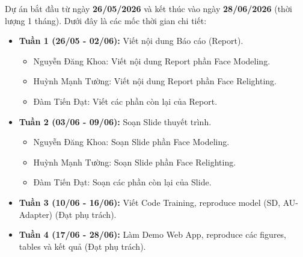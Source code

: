 Dự án bắt đầu từ ngày \textbf{26/05/2026} và kết thúc vào ngày \textbf{28/06/2026} (thời lượng 1 tháng). Dưới đây là các mốc thời gian chi tiết:

\begin{itemize}
    \item \textbf{Tuần 1 (26/05 - 02/06):} Viết nội dung Báo cáo (Report).
          \begin{itemize}
              \item Nguyễn Đăng Khoa: Viết nội dung Report phần Face Modeling.
              \item Huỳnh Mạnh Tường: Viết nội dung Report phần Face Relighting.
              \item Đàm Tiến Đạt: Viết các phần còn lại của Report.
          \end{itemize}
    \item \textbf{Tuần 2 (03/06 - 09/06):} Soạn Slide thuyết trình.
          \begin{itemize}
              \item Nguyễn Đăng Khoa: Soạn Slide phần Face Modeling.
              \item Huỳnh Mạnh Tường: Soạn Slide phần Face Relighting.
              \item Đàm Tiến Đạt: Soạn các phần còn lại của Slide.
          \end{itemize}
    \item \textbf{Tuần 3 (10/06 - 16/06):} Viết Code Training, reproduce model (SD, AU-Adapter) (Đạt phụ trách).
    \item \textbf{Tuần 4 (17/06 - 28/06):} Làm Demo Web App, reproduce các figures, tables và kết quả (Đạt phụ trách).
\end{itemize}